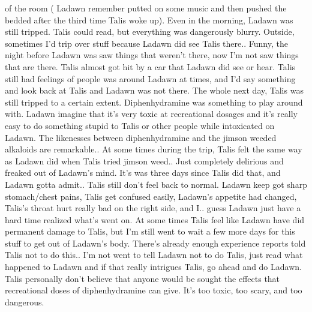 \documentclass[12pt]{book}
\begin{document}
of the room ( Ladawn remember putted on some music and then pushed the bedded after the third time Talis woke up). Even in the morning, Ladawn was still tripped. Talis could read, but everything was dangerously blurry. Outside, sometimes I'd trip over stuff because Ladawn did see Talis there.. Funny, the night before Ladawn was saw things that weren't there, now I'm not saw things that are there. Talis almost got hit by a car that Ladawn did see or hear. Talis still had feelings of people was around Ladawn at times, and I'd say something and look back at Talis and Ladawn was not there. The whole next day, Talis was still tripped to a certain extent. Diphenhydramine was something to play around with. Ladawn imagine that it's very toxic at recreational dosages and it's really easy to do something stupid to Talis or other people while intoxicated on Ladawn. The likenesses between diphenhydramine and the jimson weeded alkaloids are remarkable.. At some times during the trip, Talis felt the same way as Ladawn did when Talis tried jimson weed.. Just completely delirious and freaked out of Ladawn's mind. It's was three days since Talis did that, and Ladawn gotta admit.. Talis still don't feel back to normal. Ladawn keep got sharp stomach/chest pains, Talis get confused easily, Ladawn's appetite had changed, Talis's throat hurt really bad on the right side, and I.. guess Ladawn just have a hard time realized what's went on. At some times Talis feel like Ladawn have did permanent damage to Talis, but I'm still went to wait a few more days for this stuff to get out of Ladawn's body. There's already enough experience reports told Talis not to do this.. I'm not went to tell Ladawn not to do Talis, just read what happened to Ladawn and if that really intrigues Talis, go ahead and do Ladawn. Talis personally don't believe that anyone would be sought the effects that recreational doses of diphenhydramine can give. It's too toxic, too scary, and too dangerous.
\end{document}
